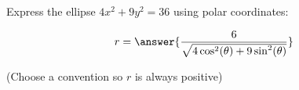 \documentclass{ximera}
\author{Jim Talamo }
\begin{document}
\begin{exercise}

Express the ellipse $4x^2+9y^2= 36$ using polar coordinates:

\[
r= \answer{ \frac{6}{\sqrt{4\cos^2(\theta)+9\sin^2(\theta)}}  }
\]

(Choose a convention so $r$ is always positive)

\end{exercise}
\end{document}
